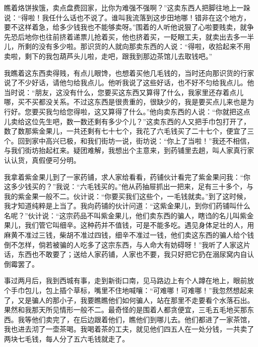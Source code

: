 \documentclass[12pt,UTF8]{ctexbook}
\begin{document}
瞧着烙饼挨饿，卖点盘费回家，比你为难强不强啊？”这卖东西人把脚往地上一跺说：“得啦！我任什么话也不说了。谁叫我流落到这步田地哪！错非在这个地方，要不这样着急，给多少钱我也不能够卖呀。”围着的人听他说狠了心啦要贱卖，就争先恐后地你也往前挤着递票儿抢着买，他也挤着买，一眨眼工夫，就卖出去多一半儿，所剩的没有多少啦。那识货的人就向那卖东西的人说：“得啦，收拾起来不用卖啦，剩下的我包葫芦头儿啦，走吧，跟我到那边茶馆儿去取钱吧。”

我瞧着这东西卖得贱，有点儿眼馋，也想着买他几毛钱的，当时还向那识货的行家说了不少好话，请他匀给我点儿。他听我说了这些好话，也不好不匀给我点儿。他当时说：“朋友，这没有什么，您要买这东西又算得了什么，我家里还存着点儿哪，买不买都没关系。不过这东西是很贵重的，很缺少的，我是要买点儿来也是为行好。您要买我匀给您得啦，这又算得了什么。”他向卖东西的人说：“你就把这点儿卖给这位先生吧，数一数还剩有多少个儿？”这卖东西的人又把手巾包打开了，数了数那紫金果儿，一共还剩有七十七个，我花了六毛钱买了二十七个，便宜了三个。回到家中高兴已极，和我们街坊一说，街坊说：“你上了当啦！”我还不相信，与我们街坊抬起杠来。疑团难解，我想出个主意来，到药铺里去趟，叫人家真行家认认货，真假便可分明。

我拿着紫金果儿到了一家药铺，求人家给看看，药铺伙计看完了紫金果问我：“你这多少钱买的？”我说：“六毛钱买的。”他从药抽屉抓出一把来，足有三十多个，与我的紫金果一般不二。伙计说：“你要买我们这些个，一毛钱就卖。”到了这时候，我才知道纯粹是上当了。我向药铺的伙计问道：“这紫金果儿，到你们药铺叫什么名呢？”伙计说：“这宗药品不叫紫金果儿，他们卖东西的骗人，瞎诌的名儿叫紫金果儿，我们管它叫细辛。这种药并不值钱，可是不能多吃。遇见身体足壮的人，用麻黄不准过三钱，柴胡不准过四钱，细辛不准过一钱，他们卖这东西的骗人给个钱倒不怎样，倘若被骗的人吃多了这宗东西，与人命大有妨碍呀！”我听了人家这片话，东西也不敢要了；送给人家药铺，人家也不要，我只好把它扔在溺尿窝内自认倒霉罢了。

事过两月后，我到西城有事，走到新街口南，见马路边上有个人蹲在地上，眼前放个手巾包儿，包上插个草标，嘴里不住地喊嚷：“可难哪！可难哪！”我忽然想起来了，又是骗人的那小子，我要瞧瞧他们如何骗人，站在那里不走要看个水落石出。果然和我那天所见情形一般不二。最奇怪的是围着人都贪便宜，三毛五毛地买那东西。我等他们卖完了，在后边跟着他们，瞧他们到哪儿去。他们都进了一家茶馆，我也进去沏了一壶茶喝。我喝着茶的工夫，就见他们四五人在一处分钱，一共卖了两块七毛钱，每人分了五六毛钱就走了。
\end{document}
